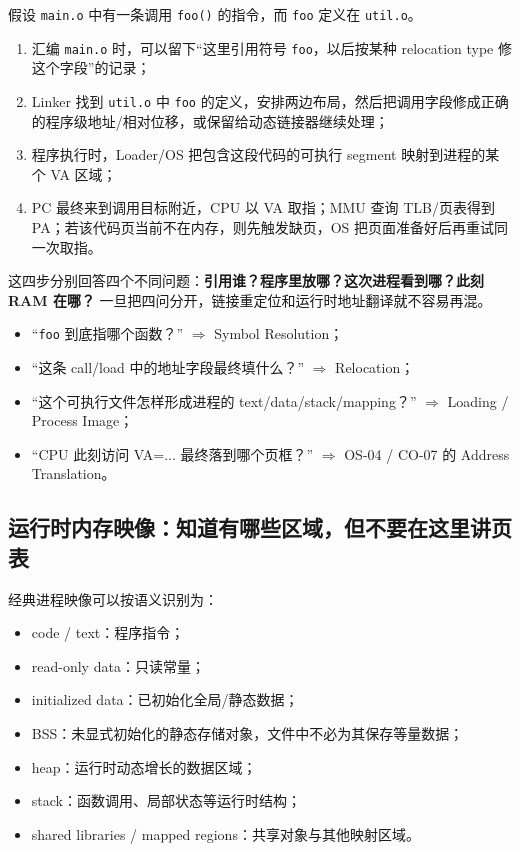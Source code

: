 \documentclass[11pt,a4paper]{ctexart}
\newcommand{\kw}[1]{\textbf{#1}}
\newcommand{\code}[1]{\texttt{#1}}
\begin{document}
\begin{method}[用一个 \code{foo()} 调用完整跑一遍]
假设 \code{main.o} 中有一条调用 \code{foo()} 的指令，而 \code{foo} 定义在 \code{util.o}。
\begin{enumerate}
  \item 汇编 \code{main.o} 时，可以留下“这里引用符号 \code{foo}，以后按某种 relocation type 修这个字段”的记录；
  \item Linker 找到 \code{util.o} 中 \code{foo} 的定义，安排两边布局，然后把调用字段修成正确的程序级地址/相对位移，或保留给动态链接器继续处理；
  \item 程序执行时，Loader/OS 把包含这段代码的可执行 segment 映射到进程的某个 VA 区域；
  \item PC 最终来到调用目标附近，CPU 以 VA 取指；MMU 查询 TLB/页表得到 PA；若该代码页当前不在内存，则先触发缺页，OS 把页面准备好后再重试同一次取指。
\end{enumerate}

这四步分别回答四个不同问题：\kw{引用谁？程序里放哪？这次进程看到哪？此刻 RAM 在哪？} 一旦把四问分开，链接重定位和运行时地址翻译就不容易再混。
\end{method}

\begin{exam}[四个高频问法分别找谁]
\begin{itemize}
  \item “\code{foo} 到底指哪个函数？” $\Rightarrow$ Symbol Resolution；
  \item “这条 call/load 中的地址字段最终填什么？” $\Rightarrow$ Relocation；
  \item “这个可执行文件怎样形成进程的 text/data/stack/mapping？” $\Rightarrow$ Loading / Process Image；
  \item “CPU 此刻访问 VA=... 最终落到哪个页框？” $\Rightarrow$ OS-04 / CO-07 的 Address Translation。
\end{itemize}
\end{exam}

\subsection{运行时内存映像：知道有哪些区域，但不要在这里讲页表}

经典进程映像可以按语义识别为：
\begin{itemize}
  \item code / text：程序指令；
  \item read-only data：只读常量；
  \item initialized data：已初始化全局/静态数据；
  \item BSS：未显式初始化的静态存储对象，文件中不必为其保存等量数据；
  \item heap：运行时动态增长的数据区域；
  \item stack：函数调用、局部状态等运行时结构；
  \item shared libraries / mapped regions：共享对象与其他映射区域。
\end{itemize}
\end{document}
